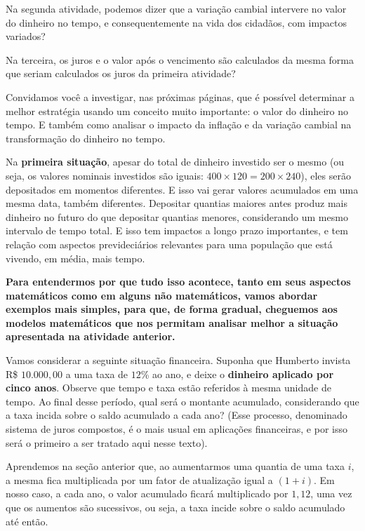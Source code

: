 Na segunda atividade, podemos dizer que a variação cambial intervere no valor do dinheiro no tempo, e consequentemente na vida dos cidadãos, com impactos variados?

Na terceira, os juros e o valor após o vencimento são calculados da mesma forma que seriam calculados os juros da primeira atividade?

Convidamos você a investigar, nas próximas páginas, que é possível determinar a melhor estratégia usando um conceito muito importante: o valor do dinheiro no tempo. E também como analisar o impacto da inflação e da variação cambial na transformação do dinheiro no tempo.

Na \textbf{primeira situação}, apesar do total de dinheiro investido ser o mesmo (ou seja, os valores nominais investidos são iguais: $400 \times 120 = 200 \times 240$), eles serão depositados em momentos diferentes. E isso vai gerar valores acumulados em uma mesma data, também diferentes. Depositar quantias maiores antes produz mais dinheiro no futuro do que depositar quantias menores, considerando um mesmo intervalo de tempo total. E isso tem impactos a longo prazo importantes, e tem relação com aspectos prevideciários relevantes para uma população que está vivendo, em média, mais tempo.

\textbf{Para entendermos por que tudo isso acontece, tanto em seus aspectos matemáticos como em alguns não matemáticos, vamos abordar exemplos mais simples, para que, de forma gradual, cheguemos aos modelos matemáticos que nos permitam analisar melhor a situação apresentada na atividade anterior.}

Vamos considerar a seguinte situação financeira. Suponha que Humberto invista R\$ $10.000{,}00$ a uma taxa de $12$\% ao ano, e deixe o \textbf{dinheiro aplicado por cinco anos}. Observe que tempo e taxa estão referidos à mesma unidade de tempo. Ao final desse período, qual será o montante acumulado, considerando que a taxa incida sobre o saldo acumulado a cada ano? (Esse processo, denominado sistema de juros compostos, é o mais usual em aplicações financeiras, e por isso será o primeiro a ser tratado aqui nesse texto).

Aprendemos na seção anterior que, ao aumentarmos uma quantia de uma taxa $i$, a mesma fica multiplicada por um fator de atualização igual a $(1+i)$. Em nosso caso, a cada ano, o valor acumulado ficará multiplicado por $1,12$, uma vez que os aumentos são sucessivos, ou seja, a taxa incide sobre o saldo acumulado até então.

